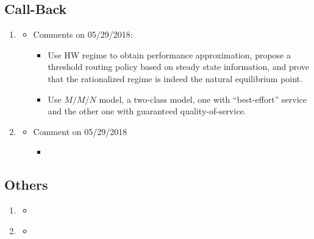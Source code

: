\subsection{Call-Back}
\begin{enumerate}
    \item \citet{Armony2004OnDesign}
    \begin{itemize}
        \item Comments on 05/29/2018:
            \begin{itemize}
                \item Use HW regime to obtain performance approximation, propose a threshold routing policy based on steady state information, and prove that the rationalized regime is indeed the natural equilibrium point.
                \item Use $M/M/N$ model, a two-class model, one with ``best-effort'' service and the other one with guaranteed quality-of-service. 
            \end{itemize}
    \end{itemize}
    
    \item \citet{Armony2004ContactInformation}
    \begin{itemize}
        \item Comment on 05/29/2018
        \begin{itemize}
            \item 
        \end{itemize}
    \end{itemize}
\end{enumerate}

\subsection{Others}
\begin{enumerate}
\item \citet{Gans2015ParametricScheduling} 
\begin{itemize}
    \item 
\end{itemize}

\item \citet{Avramidis2004ModelingCenter}
\begin{itemize}
\item 
\end{itemize}

\end{enumerate}